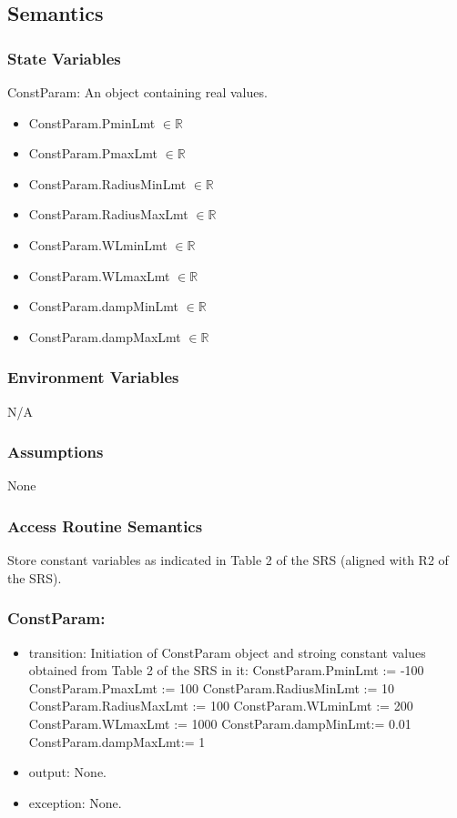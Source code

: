 \documentclass[12pt, titlepage]{article}
\begin{document}
	\subsection{Semantics}
	
	\subsubsection{State Variables} ConstParam: An object containing real values.
	\begin{itemize} \item ConstParam.PminLmt $\in \mathbb{R}$ \item
		ConstParam.PmaxLmt $\in \mathbb{R}$ \item ConstParam.RadiusMinLmt $\in
		\mathbb{R}$ \item ConstParam.RadiusMaxLmt $\in \mathbb{R}$ \item
		ConstParam.WLminLmt $\in \mathbb{R}$ \item ConstParam.WLmaxLmt $\in \mathbb{R}$
		\item ConstParam.dampMinLmt $\in \mathbb{R}$ \item ConstParam.dampMaxLmt $\in
		\mathbb{R}$ \end{itemize}
	
	\subsubsection{Environment Variables}
	
	N/A \subsubsection{Assumptions}
	
	None
	
	\subsubsection{Access Routine Semantics} Store constant variables as indicated
	in Table 2 of the SRS (aligned with R2 of the SRS).
	
	\subsubsection*{ConstParam:} \begin{itemize} \item transition: Initiation of
		ConstParam object and stroing constant values obtained from Table 2 of the SRS
		in it: \subitem ConstParam.PminLmt := -100 \subitem ConstParam.PmaxLmt := 100
		\subitem ConstParam.RadiusMinLmt := 10 \subitem ConstParam.RadiusMaxLmt := 100
		\subitem ConstParam.WLminLmt := 200 \subitem ConstParam.WLmaxLmt := 1000
		\subitem ConstParam.dampMinLmt:= 0.01 \subitem ConstParam.dampMaxLmt:= 1
		
		\item output: None. \item exception: None. \end{itemize}
	
\end{document}
